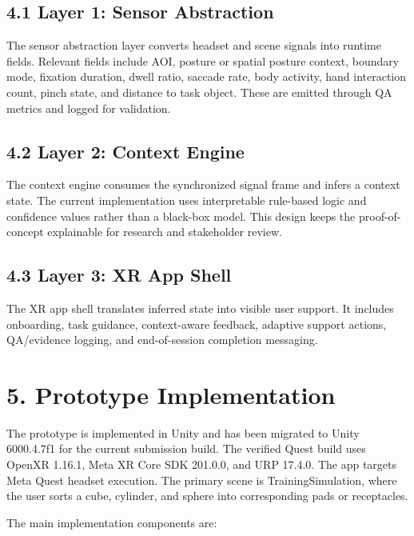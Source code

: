 \documentclass[
  10pt,
]{article}
\begin{document}
\subsection{4.1 Layer 1: Sensor
Abstraction}\label{layer-1-sensor-abstraction}

The sensor abstraction layer converts headset and scene signals into
runtime fields. Relevant fields include AOI, posture or spatial posture
context, boundary mode, fixation duration, dwell ratio, saccade rate,
body activity, hand interaction count, pinch state, and distance to task
object. These are emitted through QA metrics and logged for validation.

\subsection{4.2 Layer 2: Context Engine}\label{layer-2-context-engine}

The context engine consumes the synchronized signal frame and infers a
context state. The current implementation uses interpretable rule-based
logic and confidence values rather than a black-box model. This design
keeps the proof-of-concept explainable for research and stakeholder
review.

\subsection{4.3 Layer 3: XR App Shell}\label{layer-3-xr-app-shell}

The XR app shell translates inferred state into visible user support. It
includes onboarding, task guidance, context-aware feedback, adaptive
support actions, QA/evidence logging, and end-of-session completion
messaging.

\section{5. Prototype Implementation}\label{prototype-implementation}

The prototype is implemented in Unity and has been migrated to Unity
6000.4.7f1 for the current submission build. The verified Quest build
uses OpenXR 1.16.1, Meta XR Core SDK 201.0.0, and URP 17.4.0. The app
targets Meta Quest headset execution. The primary scene is
TrainingSimulation, where the user sorts a cube, cylinder, and sphere
into corresponding pads or receptacles.

The main implementation components are:
\end{document}
